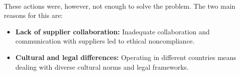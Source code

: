 \paragraph{} These actions were, however, not enough to solve the problem. The two main reasons for this are:
\begin{itemize}[label=]
    \item \textbf{Lack of supplier collaboration:} Inadequate collaboration and communication with suppliers led to ethical noncompliance.
    \item \textbf{Cultural and legal differences:} Operating in different countries means dealing with diverse cultural norms and legal frameworks.

\end{itemize}